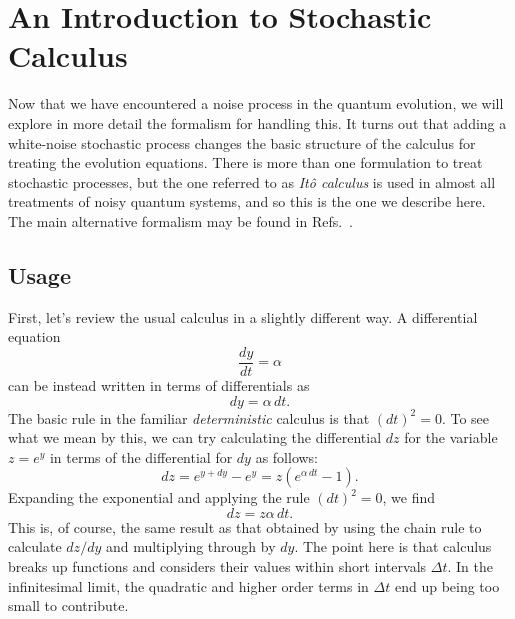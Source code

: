 \documentclass[aps,twocolumn,superscriptaddress,footinbib,floatfix,showpacs]{revtex4}
\begin{document}
\section{An Introduction to Stochastic Calculus}
\label{section:Ito}

Now that we have encountered a noise process in the quantum evolution,
we will explore in more detail the formalism for handling this.
It turns out that adding a white-noise stochastic process changes the
basic structure of the calculus for treating the evolution equations.
There is more than one formulation 
to treat stochastic 
processes, but the one referred to as \textit{It\^o calculus} is used in almost 
all treatments of noisy quantum systems, and so this is the one we describe 
here. The main alternative formalism may be found in
Refs.~\cite{gardiner,Kloeden92}.

\subsection{Usage}

First, let's review the usual calculus in a slightly different way.
A differential equation
\begin{equation}
  \frac{dy}{dt} = \alpha
\end{equation}
can be instead written in terms of differentials as
\begin{equation}
   dy= \alpha\,dt.
\end{equation}
The basic rule in the familiar \textit{deterministic} calculus is that $(dt)^2=0$.
To see what we mean by this, we can try calculating the differential $dz$ for 
the variable $z=e^y$ in terms of the differential for $dy$  as follows:
\begin{equation}
  dz = e^{y+dy}-e^y = z\left(e^{\alpha\,dt}-1\right).
\end{equation}
Expanding the exponential and applying the rule $(dt)^2=0$,
we find
\begin{equation}
  dz = z\alpha\,dt.
\end{equation}
This is, of course, the same result as that obtained by using the chain rule 
to calculate $dz/dy$ and multiplying through by $dy$.
The point here is that calculus breaks up functions and considers
their values within short intervals $\Delta t$.  In the infinitesimal
limit, the quadratic and higher order terms in $\Delta t$ end up being
too small to contribute.
\end{document}
